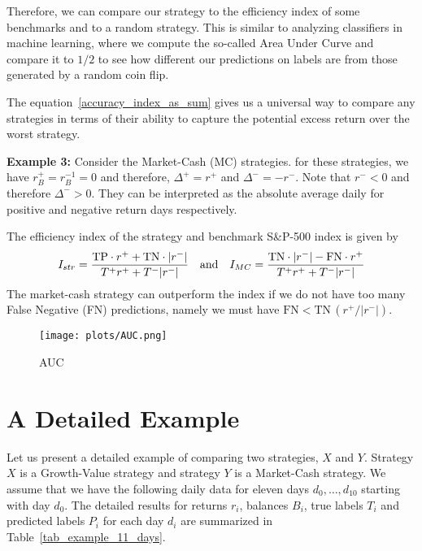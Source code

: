 \documentclass{article}
\begin{document}
Therefore, we can compare our strategy to the efficiency index of some benchmarks and to a random strategy. This is similar to analyzing classifiers in machine learning, where we compute the so-called Area Under Curve and compare it to $1/2$ to see how different our predictions on labels are from those generated by a random coin flip. 

The equation~\eqref{accuracy_index_as_sum} gives us a universal way to compare any 
strategies in terms of their ability to capture the potential excess return over the worst strategy. 


\medskip
\noindent
{\bf Example 3: } Consider the Market-Cash (MC) strategies.
for these strategies, we have $r_{B}^{+}=r_{B}^{-1}=0$ and
therefore, $\Delta^{+}=r^{+}$ and $\Delta^{-}=-r^{-}$. Note that $r^{-}<0$ and therefore $\Delta^{-}>0$. They can be interpreted as the absolute average daily for positive and negative return days respectively.

The efficiency index of the strategy and benchmark S{\&}P-500 index is given by
\begin{equation}
I_{str} = \frac{\text{TP}\cdot r^{+} +\text{TN}\cdot \vert r^{-}\vert }
{T^{+} r^{+} + T^{-}\vert r^{-}\vert } \quad \hbox{and}
\quad 
I_{MC} = \frac{\text{TN}\cdot \vert r^{-}\vert  -\text{FN}\cdot  r^{+} }
{T^{+} r^{+} + T^{-}\vert r^{-}\vert }
\end{equation}
The market-cash strategy can outperform the index if we do not have too many False Negative (FN) predictions, namely we must have $\text{FN}<\text{TN}\, (r^{+}/\vert r^{-}\vert)$.
\begin{figure}[htbp]
  \centering
  \texttt{[image: plots/AUC.png]}
  \caption{AUC}
  \label{fig:winer_loser_fridays}
\end{figure}


\section{A Detailed Example}
\label{section_detailed_example}

Let us present a detailed example of comparing two strategies, $X$ and $Y$. Strategy $X$ is a Growth-Value strategy and strategy $Y$ is a Market-Cash strategy. We assume that we have the following daily data 
for eleven days
$d_{0},\ldots, d_{10}$ starting with day $d_{0}$. The detailed results for returns $r_{i}$, balances $B_{i}$,
true labels $T_{i}$ and predicted labels $P_{i}$ for each day $d_{i}$ are summarized in Table~\ref{tab_example_11_days}.
\end{document}
